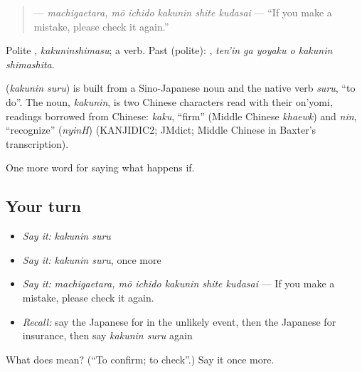 \begin{quote}
\textbf{   } — \emph{machigaetara, mō ichido kakunin shite kudasai} — \textquotedblleft{}If you make a mistake, please check it again.\textquotedblright{}
\end{quote}

Polite \textbf{}, \emph{kakuninshimasu}; a  verb. Past (polite): \textbf{  }, \emph{ten'in ga yoyaku o kakunin shimashita}.

\begin{cousinweb}
\textbf{} (\emph{kakunin suru}) is built from a Sino-Japanese noun and the native verb \emph{suru}, \textquotedblleft{}to do\textquotedblright{}. The noun, \emph{kakunin}, is two Chinese characters read with their on'yomi, readings borrowed from Chinese: \emph{kaku}, \textquotedblleft{}firm\textquotedblright{} (Middle Chinese \emph{khaewk}) and \emph{nin}, \textquotedblleft{}recognize\textquotedblright{} (\emph{nyinH}) (KANJIDIC2; JMdict; Middle Chinese in Baxter's transcription).
\end{cousinweb}

\begin{grammarlens}[title={What you've built}]
One more word for saying what happens if.
\end{grammarlens}

\subsection*{Your turn}
\begin{itemize}
\raggedright
  \item \emph{Say it:} \emph{kakunin suru}
  \item \emph{Say it:} \emph{kakunin suru}, once more
  \item \emph{Say it:} \emph{machigaetara, mō ichido kakunin shite kudasai} — If you make a mistake, please check it again.
  \item \emph{Recall:} say the Japanese for in the unlikely event, then the Japanese for insurance, then say \emph{kakunin suru} again
\end{itemize}

\begin{tcolorbox}[breakable,colback=teal!4,colframe=teal!35!black,title={Before you move on}]
What does  mean? (\textquotedblleft{}To confirm; to check\textquotedblright{}.) Say it once more.
\end{tcolorbox}
